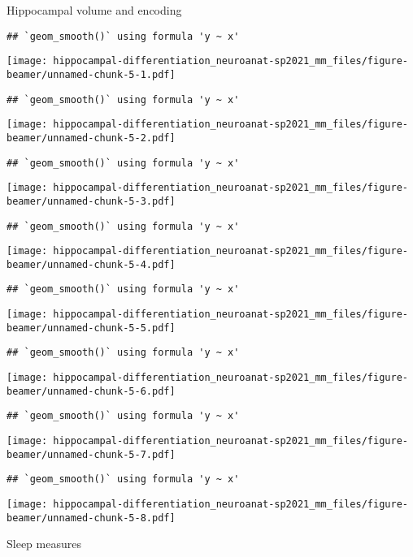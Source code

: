 \documentclass[
  ignorenonframetext,
]{beamer}
\begin{document}
\begin{frame}[fragile]{Hippocampal volume and encoding}
\protect\hypertarget{hippocampal-volume-and-encoding}{}
\begin{verbatim}
## `geom_smooth()` using formula 'y ~ x'
\end{verbatim}

\texttt{[image: hippocampal-differentiation\_neuroanat-sp2021\_mm\_files/figure-beamer/unnamed-chunk-5-1.pdf]}

\begin{verbatim}
## `geom_smooth()` using formula 'y ~ x'
\end{verbatim}

\texttt{[image: hippocampal-differentiation\_neuroanat-sp2021\_mm\_files/figure-beamer/unnamed-chunk-5-2.pdf]}

\begin{verbatim}
## `geom_smooth()` using formula 'y ~ x'
\end{verbatim}

\texttt{[image: hippocampal-differentiation\_neuroanat-sp2021\_mm\_files/figure-beamer/unnamed-chunk-5-3.pdf]}

\begin{verbatim}
## `geom_smooth()` using formula 'y ~ x'
\end{verbatim}

\texttt{[image: hippocampal-differentiation\_neuroanat-sp2021\_mm\_files/figure-beamer/unnamed-chunk-5-4.pdf]}

\begin{verbatim}
## `geom_smooth()` using formula 'y ~ x'
\end{verbatim}

\texttt{[image: hippocampal-differentiation\_neuroanat-sp2021\_mm\_files/figure-beamer/unnamed-chunk-5-5.pdf]}

\begin{verbatim}
## `geom_smooth()` using formula 'y ~ x'
\end{verbatim}

\texttt{[image: hippocampal-differentiation\_neuroanat-sp2021\_mm\_files/figure-beamer/unnamed-chunk-5-6.pdf]}

\begin{verbatim}
## `geom_smooth()` using formula 'y ~ x'
\end{verbatim}

\texttt{[image: hippocampal-differentiation\_neuroanat-sp2021\_mm\_files/figure-beamer/unnamed-chunk-5-7.pdf]}

\begin{verbatim}
## `geom_smooth()` using formula 'y ~ x'
\end{verbatim}

\texttt{[image: hippocampal-differentiation\_neuroanat-sp2021\_mm\_files/figure-beamer/unnamed-chunk-5-8.pdf]}
\end{frame}

\begin{frame}{Sleep measures}
\protect\hypertarget{sleep-measures}{}
\end{frame}
\end{document}

